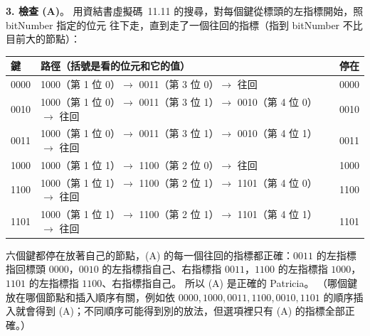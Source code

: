 \begin{pastsoln}
\textbf{3. 檢查 (A)}。 用資結書虛擬碼~11.11 的搜尋，對每個鍵從標頭的左指標開始，照 bitNumber 指定的位元
往下走，直到走了一個往回的指標（指到 bitNumber 不比目前大的節點）：
\begin{center}
\small
\begin{tabular}{lll}
\toprule
鍵 & 路徑（括號是看的位元和它的值） & 停在 \\
\midrule
0000 & 1000（第 1 位 0）$\to$ 0011（第 3 位 0）$\to$ 往回 & 0000 \\
0010 & 1000（第 1 位 0）$\to$ 0011（第 3 位 1）$\to$ 0010（第 4 位 0）$\to$ 往回 & 0010 \\
0011 & 1000（第 1 位 0）$\to$ 0011（第 3 位 1）$\to$ 0010（第 4 位 1）$\to$ 往回 & 0011 \\
1000 & 1000（第 1 位 1）$\to$ 1100（第 2 位 0）$\to$ 往回 & 1000 \\
1100 & 1000（第 1 位 1）$\to$ 1100（第 2 位 1）$\to$ 1101（第 4 位 0）$\to$ 往回 & 1100 \\
1101 & 1000（第 1 位 1）$\to$ 1100（第 2 位 1）$\to$ 1101（第 4 位 1）$\to$ 往回 & 1101 \\
\bottomrule
\end{tabular}
\end{center}
六個鍵都停在放著自己的節點，(A) 的每一個往回的指標都正確：$0011$ 的左指標指回標頭 $0000$，$0010$
的左指標指自己、右指標指 $0011$，$1100$ 的左指標指 $1000$，$1101$ 的左指標指 $1100$、右指標指自己。
所以 (A) 是正確的 Patricia。 （哪個鍵放在哪個節點和插入順序有關，例如依 $0000, 1000, 0011, 1100,
0010, 1101$ 的順序插入就會得到 (A)；不同順序可能得到別的放法，但選項裡只有 (A) 的指標全部正確。）
\end{pastsoln}
